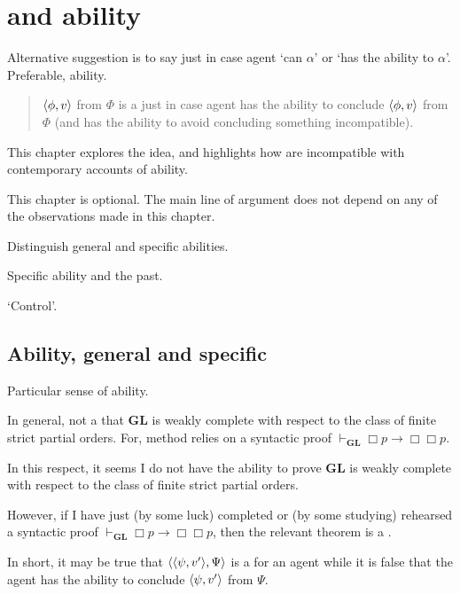\chapter{ and ability}
\label{cha:sec:fcs-def:ability}

\begin{note}
  Alternative suggestion is to say \pevent{} just in case agent `can \(\alpha\)' or `has the ability to \(\alpha\)'.
  Preferable, ability.

  \begin{quote}
    \(\langle \phi, v \rangle\) from \(\Phi\) is a \fc{} just in case agent has the ability to conclude \(\langle \phi, v \rangle\) from \(\Phi\) (and has the ability to avoid concluding something incompatible).
  \end{quote}

  This chapter explores the idea, and highlights how  are incompatible with contemporary accounts of ability.

  This chapter is optional.
  The main line of argument does not depend on any of the observations made in this chapter.
\end{note}


\begin{note}
  \begin{TOCEnum}
  \item

    Distinguish general and specific abilities.
  \item

    Specific ability and the past.
  \item

    `Control'.
  \end{TOCEnum}
\end{note}

\section{Ability, general and specific}
\label{cha:sec:fcs-def:ability:abil-gener-spec}

\begin{note}
  Particular sense of ability.

  {
    \color{blue}
  In general, not a \fc{} that \(\mathbf{GL}\) is weakly complete with respect to the class of finite strict partial orders.
  For, method relies on a syntactic proof \(\vdash_{\mathbf{GL}} \Box p \rightarrow \Box \Box p\).

  In this respect, it seems I do not have the ability to prove \(\mathbf{GL}\) is weakly complete with respect to the class of finite strict partial orders.

  However, if I have just (by some luck) completed or (by some studying) rehearsed a syntactic proof \(\vdash_{\mathbf{GL}} \Box p \rightarrow \Box \Box p\), then the relevant theorem is a \fc{}.
  }

  In short, it may be true that \(\langle \langle \psi, v' \rangle, \Psi \rangle\) is a \fc{} for an agent while it is false that the agent has the ability to conclude \(\langle \psi, v' \rangle\) from \(\Psi\).
\end{note}

